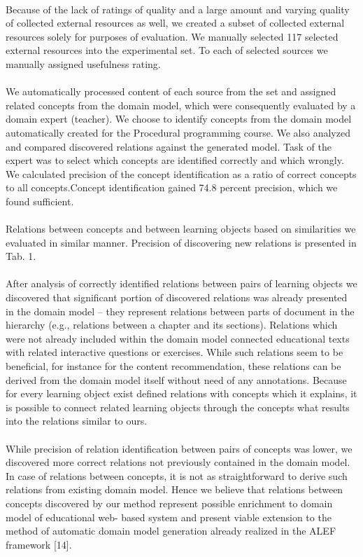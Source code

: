 \documentclass{llncs}
\begin{document}
\\
Because of the lack of ratings of quality and a large amount and varying quality of collected external resources as well, we created a subset of collected external resources solely for purposes of evaluation. We manually selected 117 selected external resources into the experimental set. To each of selected sources we manually assigned usefulness rating.\\
\\
We automatically processed content of each source from the set and assigned related concepts from the domain model, which were consequently evaluated by a domain expert (teacher). We choose to identify concepts from the domain model automatically created for the Procedural programming course. We also analyzed and compared discovered relations against the generated model. Task of the expert was to select which concepts are identified correctly and which wrongly. We calculated precision of the concept identification as a ratio of correct concepts to all concepts.Concept identification gained 74.8 percent precision, which we found sufficient.\\
\\
Relations between concepts and between learning objects based on similarities we evaluated in similar manner. Precision of discovering new relations is presented in Tab. 1.\\
\\  
After analysis of correctly identified relations between pairs of learning objects we discovered that significant portion of discovered relations was already presented in the domain model – they represent relations between parts of document in the hierarchy (e.g., relations between a chapter and its sections). Relations which were not already included within the domain model connected educational texts with related interactive questions or exercises. While such relations seem to be beneficial, for instance for the content recommendation, these relations can be derived from the domain model itself without need of any annotations. Because for every learning object exist defined relations with concepts which it explains, it is possible to connect related learning objects through the concepts what results into the relations similar to ours.\\
\\
While precision of relation identification between pairs of concepts was lower, we discovered more correct relations not previously contained in the domain model. In case of relations between concepts, it is not as straightforward to derive such relations from existing domain model. Hence we believe that relations between concepts discovered by our method represent possible enrichment to domain model of educational web- based system and present viable extension to the method of automatic domain model generation already realized in the ALEF framework [14]. 
\end{document}
